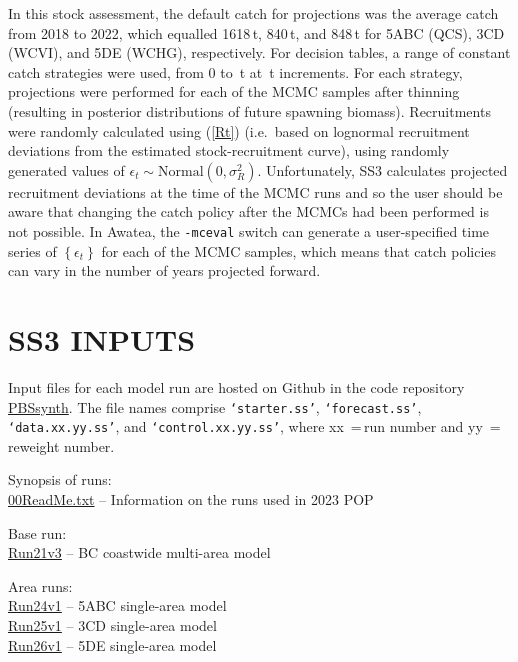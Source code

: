 \documentclass[11pt]{book}
\newcommand{\code}[1]{\normalsize\texttt{#1}\normalsize}%
\def\hsd{\hspace*{1ex}}
\def\tab{\hsd\hsd}
\newcommand{\eref}[1]{(\ref{#1})}
\begin{document}
In this stock assessment, the default catch for projections was the average catch from 2018 to 2022, which equalled 1618\,t, 840\,t, and 848\,t for 5ABC (QCS), 3CD (WCVI), and 5DE (WCHG), respectively.
For decision tables, a range of constant catch strategies were used, from 0 to \policyMax\,t at \policyInc\,t increments.
For each strategy, projections were performed for each of the \Nbase{} MCMC samples after thinning (resulting in posterior distributions of future spawning biomass).
Recruitments were randomly calculated using \eref{Rt} (i.e.~based on lognormal recruitment deviations from the estimated stock-recruitment curve), using randomly generated values of $\epsilon_t \sim \mbox{Normal}(0, \sigma_R^2)$. 
Unfortunately, SS3 calculates projected recruitment deviations at the time of the MCMC runs and so the user should be aware that changing the catch policy after the MCMCs had been performed is not possible. 
In Awatea, the \code{-mceval} switch can generate a user-specified time series of $\left\{ \epsilon_t \right\}$ for each of the MCMC samples, which means that catch policies can vary in the number of years projected forward.

\section{SS3 INPUTS} \label{s:inputs}

Input files for each model run are hosted on Github in the code repository \href{https://github.com/pbs-software/pbs-synth}{PBSsynth}.
The file names comprise \code{`starter.ss'}, \code{`forecast.ss'}, \code{`data.xx.yy.ss'}, and \code{`control.xx.yy.ss'}, where xx~=\,run number and yy~=\,reweight number.

Synopsis of runs:\\
\tab \href{https://github.com/pbs-software/pbs-synth/tree/master/PBSsynth/inst/input/2023/POP/00ReadMe.txt}{00ReadMe.txt} -- Information on the runs used in 2023 POP

Base run:\\
\tab \href{https://github.com/pbs-software/pbs-synth/tree/master/PBSsynth/inst/input/2023/POP/CST/Base/Run21v3/21.01}{Run21v3} -- BC coastwide multi-area model

Area runs:\\
\tab \href{https://github.com/pbs-software/pbs-synth/tree/master/PBSsynth/inst/input/2023/POP/5ABC/Run24v1/24.01}{Run24v1} -- 5ABC single-area model\\
\tab \href{https://github.com/pbs-software/pbs-synth/tree/master/PBSsynth/inst/input/2023/POP/3CD/Run25v1/25.01}{Run25v1} -- 3CD single-area model\\
\tab \href{https://github.com/pbs-software/pbs-synth/tree/master/PBSsynth/inst/input/2023/POP/5DE/Run26v1/26.01}{Run26v1} -- 5DE single-area model
\end{document}
